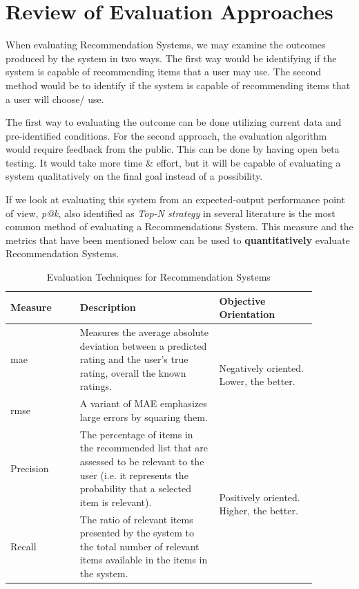 \section{Review of Evaluation Approaches}
When evaluating Recommendation Systems, we may examine the outcomes produced by the system in two ways.
The first way would be identifying if the system is capable of recommending items that a user may use. The second method would be to identify if the system is capable of recommending items that a user will choose/ use.

\bigbreak
The first way to evaluating the outcome can be done utilizing current data and pre-identified conditions. For the second approach, the evaluation algorithm would require feedback from the public. This can be done by having open beta testing. It would take more time \& effort, but it will be capable of evaluating a system qualitatively on the final goal instead of a possibility.

If we look at evaluating this system from an expected-output performance point of view, \textit{\gls{p@k}}, also identified as \textit{Top-N strategy} in several literature is the most common method of evaluating a Recommendations System.
This measure and the metrics that have been mentioned below can be used to \textbf{quantitatively} evaluate Recommendation Systems.


\begin{longtable}{|p{0.2\linewidth}|p{0.4\linewidth}|p{0.28\linewidth}|} 
\caption{Evaluation Techniques for Recommendation Systems}
\label{tab:evaluation-techniques-table}\\
\hline
Measure & Description & Objective Orientation \\ 
\hline
\gls{mae} & Measures the average absolute deviation between a predicted rating and the user’s true rating, overall the known ratings. & \multirow{2}{=}{Negatively oriented. Lower, the better.} \\ 
\cline{1-2}
\gls{rmse} & A variant of MAE emphasizes large errors by squaring them. &  \\ 
\hline
Precision & The percentage of items in the recommended list that are assessed to be relevant to the user (i.e. it represents the probability that a selected item is relevant). & \multirow{2}{=}{Positively oriented. Higher, the better.} \\ 
\cline{1-2}
Recall & The ratio of relevant items presented by the system to the total number of relevant items available in the items in the system. &  \\
\hline
\end{longtable}

